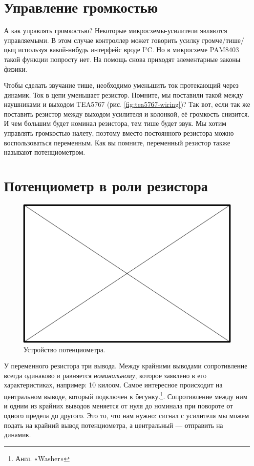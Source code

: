 \section{Управление громкостью}

А как управлять громкостью? Некоторые микросхемы-усилители являются управляемыми. В этом случае контроллер может говорить усилку громче/тише/цыц используя какой-нибудь интерфейс вроде I²C. Но в микросхеме PAM8403 такой функции попросту нет. На помощь снова приходят элементарные законы физики.

Чтобы сделать звучание тише, необходимо уменьшить ток протекающий через динамик. Ток в цепи уменьшает резистор. Помните, мы поставили такой между наушниками и выходом TEA5767 (рис. \ref{fig:tea5767-wiring})? Так вот, если так же поставить резистор между выходом усилителя и колонкой, её громкость снизится. И чем большим будет номинал резистора, тем тише будет звук. Мы хотим управлять громкостью налету, поэтому вместо постоянного резистора можно воспользоваться переменным. Как вы помните, переменный резистор также называют потенциометром.

\section{Потенциометр в роли резистора}


\begin{figure}
  \centering
  \includegraphics{TODO.png}
  \caption{Устройство потенциометра.}
  \label{fig:pot-internals}
\end{figure}

У переменного резистора три вывода. Между крайними выводами сопротивление всегда одинаково и равняется \emph{номинальному}, которое заявлено в его характеристиках, например: 10 килоом. Самое интересное происходит на центральном выводе, который подключен к бегунку.\footnote{Англ. «Washer»}. Сопротивление между ним и одним из крайних выводов меняется от нуля до номинала при повороте от одного предела до другого. Это то, что нам нужно: сигнал с усилителя мы можем подать на крайний вывод потенциометра, а центральный — отправить на динамик.

